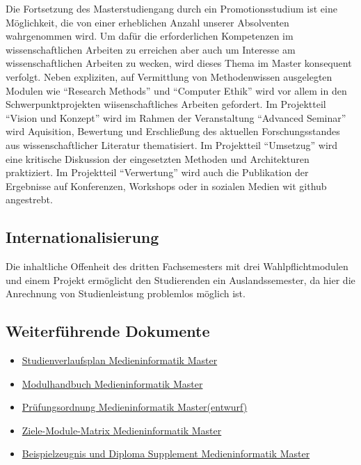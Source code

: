 Die Fortsetzung des Masterstudiengang durch ein Promotionsstudium ist
eine Möglichkeit, die von einer erheblichen Anzahl unserer Absolventen
wahrgenommen wird. Um dafür die erforderlichen Kompetenzen im
wissenschaftlichen Arbeiten zu erreichen aber auch um Interesse am
wissenschaftlichen Arbeiten zu wecken, wird dieses Thema im Master
konsequent verfolgt. Neben expliziten, auf Vermittlung von
Methodenwissen ausgelegten Modulen wie ``Research Methods'' und
``Computer Ethik'' wird vor allem in den Schwerpunktprojekten
wiisenschaftliches Arbeiten gefordert. Im Projektteil ``Vision und
Konzept'' wird im Rahmen der Veranstaltung ``Advanced Seminar'' wird
Aquisition, Bewertung und Erschließung des aktuellen Forschungsstandes
aus wissenschaftlicher Literatur thematisiert. Im Projektteil
``Umsetzug'' wird eine kritische Diskussion der eingesetzten Methoden
und Architekturen praktiziert. Im Projektteil ``Verwertung'' wird auch
die Publikation der Ergebnisse auf Konferenzen, Workshops oder in
sozialen Medien wit github angestrebt.

\subsection{Internationalisierung\label{/mi-2017/selbstbericht/0400-studiengangskonzept/0000-studiengangskonzept}}\label{internationalisierungpathlabelmi-2017selbstbericht0400-studiengangskonzept0000-studiengangskonzept}

Die inhaltliche Offenheit des dritten Fachsemesters mit drei
Wahlpflichtmodulen und einem Projekt ermöglicht den Studierenden ein
Auslandssemester, da hier die Anrechnung von Studienleistung problemlos
möglich ist.

\subsection{Weiterführende
Dokumente\label{/mi-2017/selbstbericht/0400-studiengangskonzept/0000-studiengangskonzept}}\label{weiterfuxfchrende-dokumentepathlabelmi-2017selbstbericht0400-studiengangskonzept0000-studiengangskonzept-1}

\begin{itemize}
\tightlist
\item
  \href{https://th-koeln.github.io/mi-2017/anhaenge/ma-studienverlaufsplan.pdf}{Studienverlaufsplan
  Medieninformatik Master}
\item
  \href{https://th-koeln.github.io/mi-2017/download/modulbeschreibungen-master.pdf}{Modulhandbuch
  Medieninformatik Master}
\item
  \href{https://th-koeln.github.io/mi-2017/anhaenge/ma-MIMPO_Entwurf_20170218.pdf}{Prüfungsordnung
  Medieninformatik Master(entwurf)}
\item
  \href{https://th-koeln.github.io/mi-2017/anhaenge/ma-Ziele-Module-Matrix-Medieninformatik-Master.pdf}{Ziele-Module-Matrix
  Medieninformatik Master}
\item
  \href{https://th-koeln.github.io/mi-2017/anhaenge/ma-zeugnis.pdf}{Beispielzeugnis und Diploma
  Supplement Medieninformatik Master}
\end{itemize}

